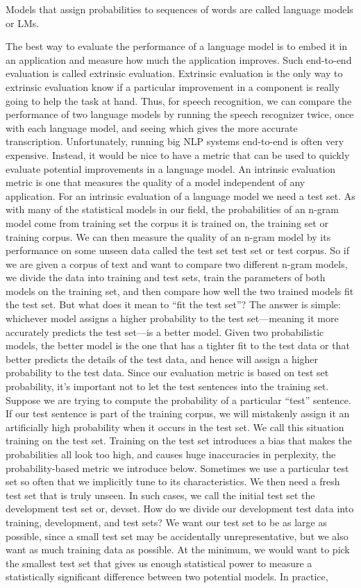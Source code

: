 \documentclass{automatextcc}
\begin{document}
Models that assign probabilities to sequences of words are called language models or LMs.

The best way to evaluate the performance of a language model is to embed it in an application and measure how much the application improves. Such end-to-end evaluation is called extrinsic evaluation. Extrinsic evaluation is the only way to extrinsic evaluation know if a particular improvement in a component is really going to help the task at hand. Thus, for speech recognition, we can compare the performance of two language models by running the speech recognizer twice, once with each language model, and seeing which gives the more accurate transcription. Unfortunately, running big NLP systems end-to-end is often very expensive. Instead, it would be nice to have a metric that can be used to quickly evaluate potential improvements in a language model. An intrinsic evaluation metric is one that measures the quality of a model independent of any application. For an intrinsic evaluation of a language model we need a test set. As with many of the statistical models in our field, the probabilities of an n-gram model come from training set the corpus it is trained on, the training set or training corpus. We can then measure the quality of an n-gram model by its performance on some unseen data called the test set test set or test corpus. So if we are given a corpus of text and want to compare two different n-gram models, we divide the data into training and test sets, train the parameters of both models on the training set, and then compare how well the two trained models fit the test set. But what does it mean to “fit the test set”? The answer is simple: whichever model assigns a higher probability to the test set—meaning it more accurately predicts the test set—is a better model. Given two probabilistic models, the better model is the one that has a tighter fit to the test data or that better predicts the details of the test data, and hence will assign a higher probability to the test data. Since our evaluation metric is based on test set probability, it’s important not to let the test sentences into the training set. Suppose we are trying to compute the probability of a particular “test” sentence. If our test sentence is part of the training corpus, we will mistakenly assign it an artificially high probability when it occurs in the test set. We call this situation training on the test set. Training on the test set introduces a bias that makes the probabilities all look too high, and causes huge inaccuracies in perplexity, the probability-based metric we introduce below. Sometimes we use a particular test set so often that we implicitly tune to its characteristics. We then need a fresh test set that is truly unseen. In such cases, we call the initial test set the development test set or, devset. How do we divide our development test data into training, development, and test sets? We want our test set to be as large as possible, since a small test set may be accidentally unrepresentative, but we also want as much training data as possible. At the minimum, we would want to pick the smallest test set that gives us enough statistical power to measure a statistically significant difference between two potential models. In practice, 
\end{document}
